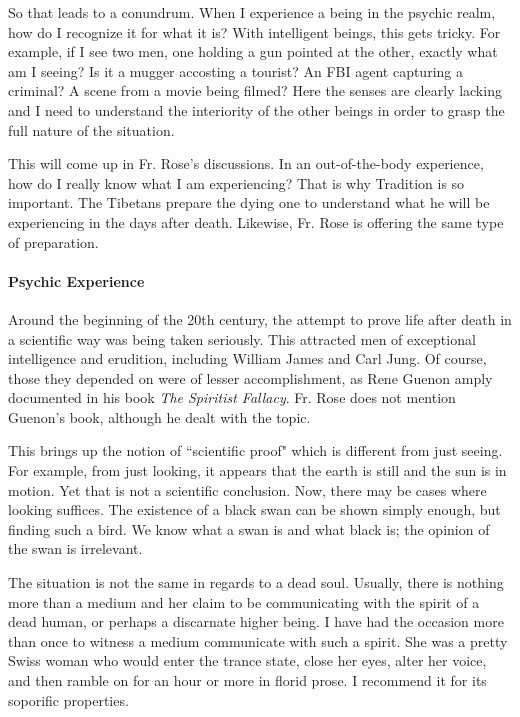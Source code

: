 So that leads to a conundrum. When I experience a being in the psychic realm, how do I recognize it for what it is? With intelligent beings, this gets tricky. For example, if I see two men, one holding a gun pointed at the other, exactly what am I seeing? Is it a mugger accosting a tourist? An FBI agent capturing a criminal? A scene from a movie being filmed? Here the senses are clearly lacking and I need to understand the interiority of the other beings in order to grasp the full nature of the situation.

This will come up in Fr. Rose's discussions. In an out-of-the-body experience, how do I really know what I am experiencing? That is why Tradition is so important. The Tibetans prepare the dying one to understand what he will be experiencing in the days after death. Likewise, Fr. Rose is offering the same type of preparation.

\paragraph{Psychic Experience}
Around the beginning of the 20th century, the attempt to prove life after death in a scientific way was being taken seriously. This attracted men of exceptional intelligence and erudition, including William James and Carl Jung. Of course, those they depended on were of lesser accomplishment, as Rene Guenon amply documented in his book \textit{The Spiritist Fallacy}. Fr. Rose does not mention Guenon's book, although he dealt with the topic.

This brings up the notion of ``scientific proof" which is different from just seeing. For example, from just looking, it appears that the earth is still and the sun is in motion. Yet that is not a scientific conclusion. Now, there may be cases where looking suffices. The existence of a black swan can be shown simply enough, but finding such a bird. We know what a swan is and what black is; the opinion of the swan is irrelevant.

The situation is not the same in regards to a dead soul.  Usually, there is nothing more than a medium and her claim to be communicating with the spirit of a dead human, or perhaps a discarnate higher being. I have had the occasion more than once to witness a medium communicate with such a spirit. She was a pretty Swiss woman who would enter the trance state, close her eyes, alter her voice, and then ramble on for an hour or more in florid prose. I recommend it for its soporific properties.

